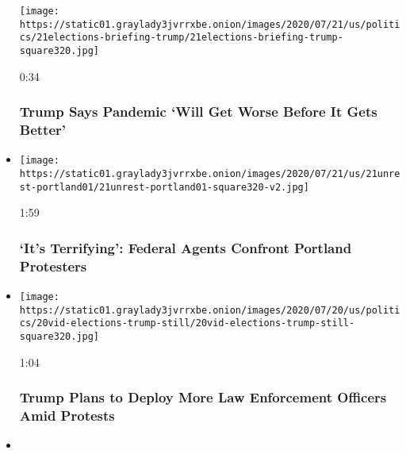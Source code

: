 \begin{itemize}
  \texttt{[image: https://static01.graylady3jvrrxbe.onion/images/2020/07/21/us/politics/21elections-briefing-trump/21elections-briefing-trump-square320.jpg]}

  0:34

  \hypertarget{trump-says-pandemic-will-get-worse-before-it-gets-better}{%
  \subsubsection{Trump Says Pandemic `Will Get Worse Before It Gets
  Better'}\label{trump-says-pandemic-will-get-worse-before-it-gets-better}}
\item
  \href{https://www.nytimes3xbfgragh.onion/video/us/100000007248945/portland-protests-federal-agents.html?action=click\&module=video-series-bar\&region=header\&pgtype=Article\&playlistId=video/u-s}{}

  \texttt{[image: https://static01.graylady3jvrrxbe.onion/images/2020/07/21/us/21unrest-portland01/21unrest-portland01-square320-v2.jpg]}

  1:59

  \hypertarget{its-terrifying-federal-agents-confront-portland-protesters}{%
  \subsubsection{`It's Terrifying': Federal Agents Confront Portland
  Protesters}\label{its-terrifying-federal-agents-confront-portland-protesters}}
\item
  \href{https://www.nytimes3xbfgragh.onion/video/us/100000007247868/trump-deploy-federal-agents.html?action=click\&module=video-series-bar\&region=header\&pgtype=Article\&playlistId=video/u-s}{}

  \texttt{[image: https://static01.graylady3jvrrxbe.onion/images/2020/07/20/us/politics/20vid-elections-trump-still/20vid-elections-trump-still-square320.jpg]}

  1:04

  \hypertarget{trump-plans-to-deploy-more-law-enforcement-officers-amid-protests}{%
  \subsubsection{Trump Plans to Deploy More Law Enforcement Officers
  Amid
  Protests}\label{trump-plans-to-deploy-more-law-enforcement-officers-amid-protests}}
\item
  \href{https://www.nytimes3xbfgragh.onion/video/us/100000007247407/trump-will-resume-virus-briefings.html?action=click\&module=video-series-bar\&region=header\&pgtype=Article\&playlistId=video/u-s}{}


\end{itemize}
